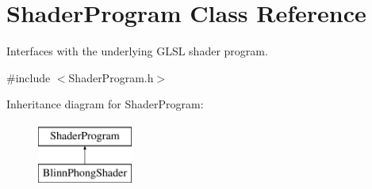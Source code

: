 \hypertarget{class_shader_program}{}\section{Shader\+Program Class Reference}
\label{class_shader_program}


Interfaces with the underlying G\+L\+S\+L shader program.  




{\ttfamily \#include $<$Shader\+Program.\+h$>$}

Inheritance diagram for Shader\+Program\+:\begin{figure}[H]
\begin{center}
\leavevmode
\includegraphics[height=2.000000cm]{class_shader_program}
\end{center}
\end{figure}
